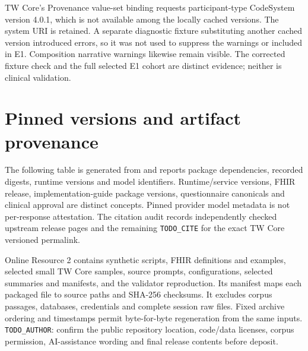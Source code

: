 TW Core's Provenance value-set binding requests participant-type CodeSystem version
4.0.1, which is not available among the locally cached versions. The system URI is
retained. A separate diagnostic fixture substituting another cached version
introduced errors, so it was not used to suppress the warnings or included in E1.
Composition narrative warnings likewise remain visible. The corrected fixture
check and the full selected E1 cohort are distinct evidence; neither is clinical
validation.

\section{Pinned versions and artifact provenance}\label{sup:s9}
The following table is generated from 
and reports package dependencies, recorded digests, runtime versions and model
identifiers. Runtime/service versions, FHIR release, implementation-guide package
versions, questionnaire canonicals and clinical approval are distinct concepts.
Pinned provider model metadata is not per-response attestation. The citation audit
records independently checked upstream release pages and the remaining
\texttt{TODO\_CITE} for the exact TW Core versioned permalink.


Online Resource 2 contains synthetic scripts, FHIR definitions and examples,
selected small TW Core samples, source prompts, configurations, selected summaries
and manifests, and the validator reproduction. Its manifest maps each packaged
file to source paths and SHA-256 checksums. It excludes corpus passages, databases,
credentials and complete session raw files. Fixed archive ordering and timestamps
permit byte-for-byte regeneration from the same inputs.
\texttt{TODO\_AUTHOR}: confirm the public repository location, code/data licenses,
corpus permission, AI-assistance wording and final release contents before deposit.
